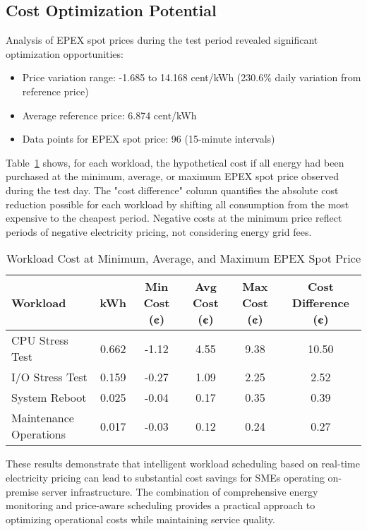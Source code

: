 \subsection{Cost Optimization Potential}
\label{results:optimization}
Analysis of EPEX spot prices during the test period revealed significant optimization opportunities:

\begin{itemize}[noitemsep,topsep=0pt]
    \item Price variation range: -1.685 to 14.168 cent/kWh (230.6\% daily variation from reference price)
    \item Average reference price: 6.874 cent/kWh
    \item Data points for EPEX spot price: 96 (15-minute intervals)
\end{itemize}

Table~\ref{tab:cost-comparison} shows, for each workload, the hypothetical cost if all energy 
had been purchased at the minimum, average, or maximum EPEX spot price observed during the test day. 
The "cost difference" column quantifies the absolute cost reduction possible for each workload 
by shifting all consumption from the most expensive to the cheapest period. Negative costs at the 
minimum price reflect periods of negative electricity pricing, not considering energy grid fees.
\newpage
\begin{table}[h]
    \caption{Workload Cost at Minimum, Average, and Maximum EPEX Spot Price}
    \label{tab:cost-comparison}
    \begin{tabular}{@{}lccccc@{}}
    \hline
    \textbf{Workload} & \textbf{kWh} & \textbf{Min Cost (¢)} & \textbf{Avg Cost (¢)} & \textbf{Max Cost (¢)} & \textbf{Cost Difference (¢)} \\
    \hline
    CPU Stress Test        & 0.662 & -1.12 & 4.55 & 9.38 & 10.50 \\
    I/O Stress Test        & 0.159 & -0.27 & 1.09 & 2.25 & 2.52 \\
    System Reboot          & 0.025 & -0.04 & 0.17 & 0.35 & 0.39 \\
    Maintenance Operations & 0.017 & -0.03 & 0.12 & 0.24 & 0.27 \\
    \hline
    \end{tabular}
    \end{table}

These results demonstrate that intelligent workload scheduling based on real-time electricity 
pricing can lead to substantial cost savings for SMEs operating on-premise server infrastructure. 
The combination of comprehensive energy monitoring and price-aware scheduling provides a practical 
approach to optimizing operational costs while maintaining service quality.

